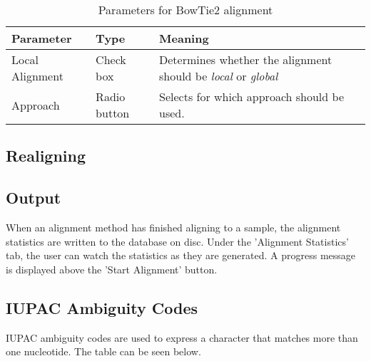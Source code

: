 \documentclass[12pt,a4paper]{article}
\begin{document}
\begin{table}[h!]
    \centering
    \begin{tabular}{|l|l|l|p{8cm}|}
    \hline
        \textbf{Parameter} &\textbf{Type}&\textbf{Meaning}  \\
        \hline
         Local Alignment & Check box & Determines whether the alignment should 
         be \textit{local} or \textit{global}\\
         \hline
         Approach & Radio button & Selects for which approach should be used.\\
         \hline
    \end{tabular}
    \caption{Parameters for BowTie2 alignment}
    \label{bowtie_parameters}
\end{table}

\subsection{Realigning}

\subsection{Output}
When an alignment method has finished aligning to a sample, the alignment 
statistics are written to the database on disc. Under the 'Alignment Statistics'
 tab, the user can watch the statistics as they are generated. A progress 
 message is displayed above the 'Start Alignment' button.

\subsection{IUPAC Ambiguity Codes}

IUPAC ambiguity codes are used to express a character that matches more than 
one nucleotide. The table can be seen below.
\end{document}
